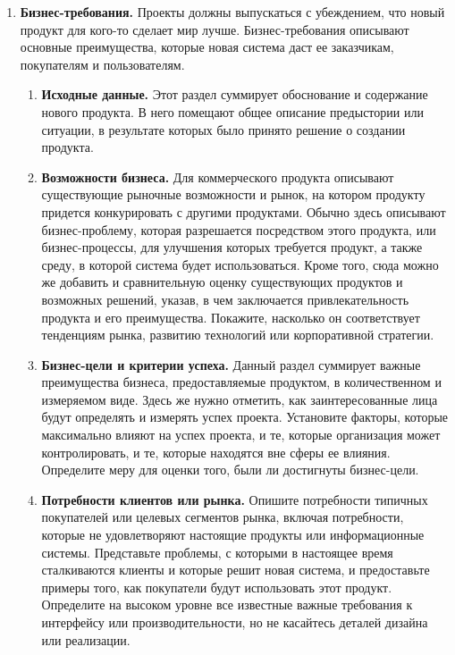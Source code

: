 \documentclass{../../text-style}
\begin{document}
\begin{enumerate}
    \item \textbf{Бизнес-требования.}
    Проекты должны выпускаться с убеждением, что новый продукт для кого-то сделает мир лучше.
    Бизнес-требования описывают основные преимущества, которые новая система даст ее заказчикам, покупателям и пользователям.
    \begin{enumerate}
        \item \textbf{Исходные данные.}
        Этот раздел суммирует обоснование и содержание нового продукта.
        В него помещают общее описание предыстории или ситуации, в результате которых было принято решение о создании продукта.
        \item \textbf{Возможности бизнеса.}
        Для коммерческого продукта описывают существующие рыночные возможности и рынок, на котором продукту придется конкурировать с другими продуктами.
        Обычно здесь описывают бизнес-проблему, которая разрешается посредством этого продукта, или бизнес-процессы, для улучшения которых требуется продукт, а также среду, в которой система будет использоваться.
        Кроме того, сюда можно же добавить и сравнительную оценку существующих продуктов и возможных решений, указав, в чем заключается привлекательность продукта и его преимущества.
        Покажите, насколько он соответствует тенденциям рынка, развитию технологий или корпоративной стратегии.
        \item \textbf{Бизнес-цели и критерии успеха.}
        Данный раздел суммирует важные преимущества бизнеса, предоставляемые продуктом, в количественном и измеряемом виде.
        Здесь же нужно отметить, как заинтересованные лица будут определять и измерять успех проекта.
        Установите факторы, которые максимально влияют на успех проекта, и те, которые организация может контролировать, и те, которые находятся вне сферы ее влияния.
        Определите меру для оценки того, были ли достигнуты бизнес-цели.
        \item \textbf{Потребности клиентов или рынка.}
        Опишите потребности типичных покупателей или целевых сегментов рынка, включая потребности, которые не удовлетворяют настоящие продукты или информационные системы.
        Представьте проблемы, с которыми в настоящее время сталкиваются клиенты и которые решит новая система, и предоставьте примеры того, как покупатели будут использовать этот продукт.
        Определите на высоком уровне все известные важные требования к интерфейсу или производительности, но не касайтесь деталей дизайна или реализации.

\end{enumerate}
\end{enumerate}
\end{document}
